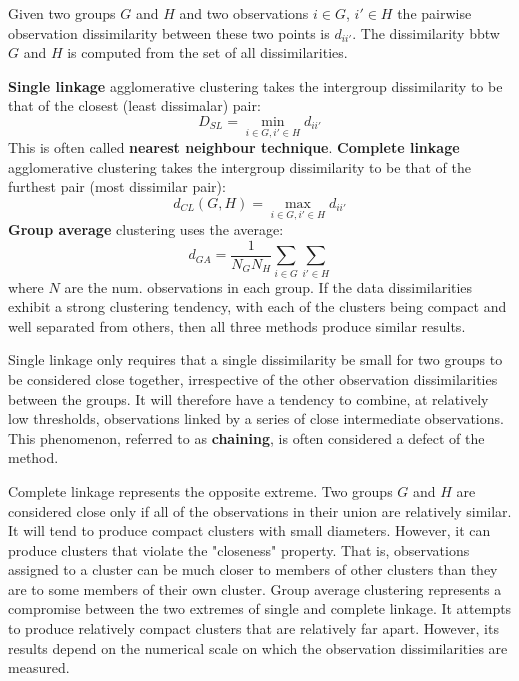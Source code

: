 Given two groups $G$ and $H$ and two observations $i \in G$, $i' \in H$ the pairwise observation dissimilarity between these two points is $d_{ii'}$. The dissimilarity bbtw $G$ and $H$ is computed from the set of all dissimilarities.

\textbf{Single linkage} agglomerative clustering takes the intergroup dissimilarity to be that of the closest (least dissimalar) pair:
\begin{equation}
D_{SL} = \min_{i \in G, i' \in H} d_{ii'}
\end{equation}
This is often called \textbf{nearest neighbour technique}. \textbf{Complete linkage} agglomerative clustering  takes the intergroup dissimilarity to be that of the furthest pair (most dissimilar pair):
\begin{equation}
d_{CL} (G,H) = \max_{i \in G, i' \in H} d_{ii'}
\end{equation}
\textbf{Group average} clustering uses the average:
\begin{equation}
d_{GA} = \frac{1}{N_GN_H}\sum_{i \in G}\sum_{i' \in H}
\end{equation}
where $N$ are the num. observations in each group. If the data dissimilarities exhibit a strong clustering tendency, with each of the clusters being compact and well separated from others, then all three methods produce similar results.

Single linkage only requires that a single dissimilarity be small for two groups to be considered close together, irrespective of the other observation dissimilarities between the groups. It will therefore have a tendency to combine, at relatively low thresholds, observations linked by a series of close intermediate observations. This phenomenon, referred to as \textbf{chaining}, is often considered a defect of the method.

Complete linkage represents the opposite extreme. Two groups $G$ and $H$ are considered close only if all of the observations in their union are relatively similar. It will tend to produce compact clusters with small diameters.
However, it can produce clusters that violate the "closeness" property. That is, observations assigned to a cluster can be much closer to members of other clusters than they are to some members of their own cluster.
Group average clustering represents a compromise between the two extremes of single and complete linkage. It attempts to produce relatively compact clusters that are relatively far apart. However, its results depend on the numerical scale on which the observation dissimilarities are measured.
